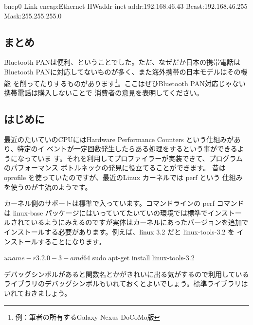 \documentclass[mingoth,a4paper]{jsarticle}
\begin{document}
\begin{commandline}
bnep0     Link encap:Ethernet  HWaddr 
          inet addr:192.168.46.43  Bcast:192.168.46.255  Mask:255.255.255.0
\end{commandline}

\subsection{まとめ}

Bluetooth PANは便利、ということでした。ただ、なぜだか日本の携帯電話は
Bluetooth PANに対応してないものが多く、また海外携帯の日本モデルはその機能
を削ってたりするものがあります\footnote{例：筆者の所有するGalaxy Nexus
DoCoMo版}。ここはぜひBluetooth PAN対応じゃない携帯電話は購入しないことで
消費者の意見を表明してください。


\subsection{はじめに}

最近のたいていのCPUにはHardware Performance Counters という仕組みがあり、特定のイ
ベントが一定回数発生したらある処理をするという事ができるようになっていま
す。それを利用してプロファイラーが実装できて、プログラムのパフォーマンス
ボトルネックの発見に役立てることができます。
昔は oprofile を使っていたのですが、最近のLinux カーネルでは perf という
仕組みを使うのが主流のようです。

カーネル側のサポートは標準で入っています。コマンドラインの perf コマンド
は linux-base パッケージにはいっていてたいていの環境では標準でインストー
ルされているようにみえるのですが実体はカーネルにあったバージョンを追加で
インストールする必要があります。例えば、linux 3.2 だと linux-tools-3.2 を
インストールすることになります。

\begin{commandline}
 $ uname -r
3.2.0-3-amd64
 $ sudo apt-get install linux-tools-3.2
\end{commandline}

デバッグシンボルがあると関数名とかがきれいに出る気がするので利用している
ライブラリのデバッグシンボルもいれておくとよいでしょう。標準ライブラリは
いれておきましょう。
\end{document}
